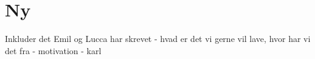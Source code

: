 \chapter{Ny}
\label{ProjektIde}
%
Inkluder det Emil og Lucca har skrevet - hvad er det vi gerne vil lave, hvor har vi det fra - motivation - karl